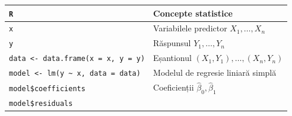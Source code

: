\documentclass[]{article}
\begin{document}
\begin{longtable}[]{@{}ll@{}}
\toprule
\begin{minipage}[b]{0.49\columnwidth}\raggedright\strut
\texttt{R}\strut
\end{minipage} & \begin{minipage}[b]{0.45\columnwidth}\raggedright\strut
Concepte statistice\strut
\end{minipage}\tabularnewline
\midrule
\endhead
\begin{minipage}[t]{0.49\columnwidth}\raggedright\strut
\texttt{x}\strut
\end{minipage} & \begin{minipage}[t]{0.45\columnwidth}\raggedright\strut
Variabilele predictor \(X_1,\ldots,X_n\)\strut
\end{minipage}\tabularnewline
\begin{minipage}[t]{0.49\columnwidth}\raggedright\strut
\texttt{y}\strut
\end{minipage} & \begin{minipage}[t]{0.45\columnwidth}\raggedright\strut
Răspunsul \(Y_1,\ldots,Y_n\)\strut
\end{minipage}\tabularnewline
\begin{minipage}[t]{0.49\columnwidth}\raggedright\strut
\texttt{data\ \textless{}-\ data.frame(x\ =\ x,\ y\ =\ y)}\strut
\end{minipage} & \begin{minipage}[t]{0.45\columnwidth}\raggedright\strut
Eșantionul \((X_1,Y_1),\ldots,(X_n,Y_n)\)\strut
\end{minipage}\tabularnewline
\begin{minipage}[t]{0.49\columnwidth}\raggedright\strut
\texttt{model\ \textless{}-\ lm(y\ \textasciitilde{}\ x,\ data\ =\ data)}\strut
\end{minipage} & \begin{minipage}[t]{0.45\columnwidth}\raggedright\strut
Modelul de regresie liniară simplă\strut
\end{minipage}\tabularnewline
\begin{minipage}[t]{0.49\columnwidth}\raggedright\strut
\texttt{model\$coefficients}\strut
\end{minipage} & \begin{minipage}[t]{0.45\columnwidth}\raggedright\strut
Coeficienții \(\hat\beta_0,\hat\beta_1\)\strut
\end{minipage}\tabularnewline
\begin{minipage}[t]{0.49\columnwidth}\raggedright\strut
\texttt{model\$residuals}\strut

\end{minipage}
\end{longtable}
\end{document}
